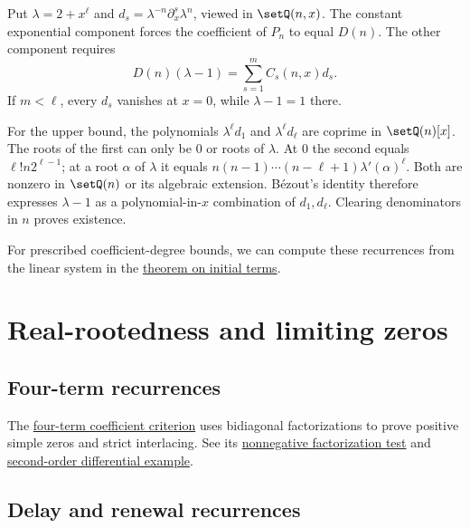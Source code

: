 \begin{proof*}
Put $\lambda=2+x^\ell$ and $d_s=\lambda^{-n}\partial_x^s\lambda^n$,
viewed in $\setQ(n,x)$. The constant exponential component forces the
coefficient of $P_n$ to equal $D(n)$. The other component requires
\[
 D(n)(\lambda-1)=\sum_{s=1}^m C_s(n,x)d_s.
\]
If $m<\ell$, every $d_s$ vanishes at $x=0$, while $\lambda-1=1$ there.

For the upper bound, the polynomials $\lambda^\ell d_1$ and
$\lambda^\ell d_\ell$ are coprime in $\setQ(n)[x]$.
The roots of the first can only be $0$ or roots of $\lambda$.
At $0$ the second equals $\ell!n2^{\ell-1}$; at a root $\alpha$ of
$\lambda$ it equals
$n(n-1)\dotsm(n-\ell+1)\lambda'(\alpha)^\ell$.
Both are nonzero in $\setQ(n)$ or its algebraic extension.
Bézout's identity therefore expresses $\lambda-1$ as a polynomial-in-$x$
combination of $d_1,d_\ell$. Clearing denominators in $n$ proves existence.
\end{proof*}

For prescribed coefficient-degree bounds, we can compute these recurrences
from the linear system in the \hyperref[recurrenceFiniteVerification]{theorem on initial terms}.

\section[recurrenceRootApplications]{Real-rootedness and limiting zeros}

\subsection[fourTermFactorization]{Four-term recurrences}
\label{fourTermCoefficientCriterion}
\label{fourTermDifferentialExample}

The \hyperref[interlacingFourTermRecurrences]{four-term coefficient criterion}
uses bidiagonal factorizations to prove positive simple zeros and strict
interlacing. See its
\hyperref[interlacingFourTermSplit]{nonnegative factorization test} and
\hyperref[interlacingSecondDerivativeExample]{second-order differential example}.

\subsection[weightedDelayRecurrences]{Delay and renewal recurrences}
\label{nondecreasingPredecessorInterlacing}
\label{weightedRenewalRecurrences}
\label{weightedRenewalInterlacing}


